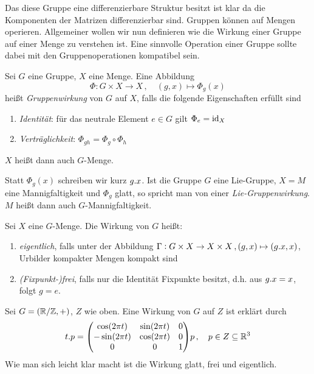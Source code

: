 Das diese Gruppe eine differenzierbare Struktur besitzt ist klar da die
Komponenten der Matrizen differenzierbar sind.
Gruppen können auf Mengen operieren.  
Allgemeiner wollen wir nun definieren wie die Wirkung einer Gruppe auf einer
Menge zu verstehen ist. Eine sinnvolle Operation einer Gruppe sollte dabei mit
den Gruppenoperationen kompatibel sein.
\begin{definition}[Gruppenwirkung]
Sei $G$ eine Gruppe, $X$ eine Menge. Eine Abbildung
\begin{equation}
\Phi:G\times X\to X\,,\quad (g,x)\mapsto\Phi_g(x)
\end{equation}
heißt \emph{Gruppenwirkung} von $G$ auf $X$, falls die folgende Eigenschaften
erfüllt sind
\begin{enumerate}
  \item \emph{Identität}: für das neutrale Element $e\in G$ gilt
  $\displaystyle\Phi_e=\operatorname{id}_X$
  \item \emph{Verträglichkeit}: $\displaystyle\Phi_{gh}=\Phi_g\circ\Phi_h$
\end{enumerate}
$X$ heißt dann auch $G$-Menge.
\end{definition}
Statt $\Phi_g(x)$ schreiben wir kurz $g. x$.
Ist die Gruppe $G$ eine Lie-Gruppe, $X=M$ eine Mannigfaltigkeit und $\Phi_g$
glatt, so spricht man von einer \emph{Lie-Gruppenwirkung}. $M$ heißt dann
auch $G$-Mannigfaltigkeit.
\begin{definition}
Sei $X$ eine $G$-Menge. Die Wirkung von $G$ heißt:
\begin{enumerate}
  \item \emph{eigentlich}, falls unter der Abbildung $\Gamma:
  G\times X\to X\times X\,,(g,x)\mapsto (g . x,x)$, Urbilder kompakter
  Mengen kompakt sind
  \item \emph{(Fixpunkt-)frei}, falls nur die Identität Fixpunkte besitzt, d.h.
  aus $g. x=x$, folgt $g=e$.
\end{enumerate}
\end{definition}
\begin{beispiel}
Sei $G=(\mathbb{R}/\mathbb{Z},+)$, $Z$ wie oben. Eine Wirkung von $G$ auf $Z$ ist
erklärt durch
\begin{equation}
t.p= \begin{pmatrix}
\cos\left( 2\pi t\right)&\sin\left( 2\pi t\right)&0\\
-\sin\left( 2\pi t\right)&\cos\left( 2\pi t\right)&0\\
0&0&1
\end{pmatrix}p\,,\quad p\in Z\subseteq \Reals^3
\end{equation}
Wie man sich leicht klar macht ist die Wirkung glatt, frei und eigentlich.
\end{beispiel}
